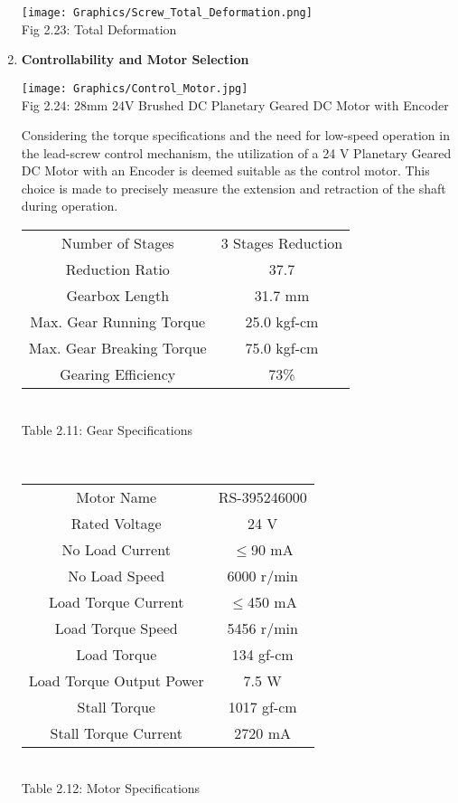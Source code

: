 \documentclass[a4,10pt]{report}
\begin{document}
\begin{enumerate}
\begin{center}
     \texttt{[image: Graphics/Screw\_Total\_Deformation.png]} \\
     \normalsize{Fig 2.23: Total Deformation} \\
\end{center}
\vspace{15mm}
\item \textbf{Controllability and Motor Selection} \\
\begin{center}
    \texttt{[image: Graphics/Control\_Motor.jpg]} \\
    Fig 2.24: 28mm 24V Brushed DC Planetary Geared DC Motor with Encoder
\end{center}
Considering the torque specifications and the need for low-speed operation in the lead-screw control mechanism, the utilization of a 24 V Planetary Geared DC Motor with an Encoder is deemed suitable as the control motor. This choice is made to precisely measure the extension and retraction of the shaft during operation.\cite{control_motor}
\begin{center}
\begin{tabular}{|c|c|}
    \hline
    Number of Stages & 3 Stages Reduction \\
    Reduction Ratio & 37.7 \\
    Gearbox Length & 31.7 mm \\
    Max. Gear Running Torque & 25.0 kgf-cm \\
    Max. Gear Breaking Torque & 75.0 kgf-cm \\
    Gearing Efficiency & 73\% \\
    \hline
\end{tabular} \\
\normalsize{Table 2.11: Gear Specifications} \\
\end{center} \\


\begin{center}
\begin{tabular}{|c|c|}
    \hline
    Motor Name & RS-395246000 \\
    Rated Voltage & 24 V \\
    No Load Current & $\le$90 mA \\
    No Load Speed & 6000 r/min \\
    Load Torque Current & $\le$450 mA \\
    Load Torque Speed & 5456 r/min \\
    Load Torque & 134 gf-cm \\
    Load Torque Output Power & 7.5 W \\
    Stall Torque & 1017 gf-cm \\
    Stall Torque Current & 2720 mA \\
    \hline
\end{tabular} \\
\normalsize{Table 2.12: Motor Specifications} \\
\end{center} \\


\end{enumerate}
\end{document}
